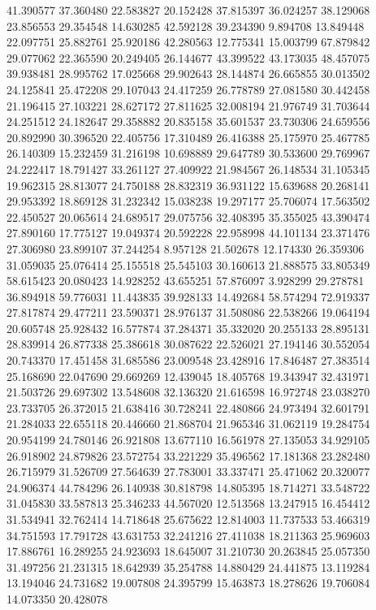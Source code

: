 41.390577
37.360480
22.583827
20.152428
37.815397
36.024257
38.129068
23.856553
29.354548
14.630285
42.592128
39.234390
9.894708
13.849448
22.097751
25.882761
25.920186
42.280563
12.775341
15.003799
67.879842
29.077062
22.365590
20.249405
26.144677
43.399522
43.173035
48.457075
39.938481
28.995762
17.025668
29.902643
28.144874
26.665855
30.013502
24.125841
25.472208
29.107043
24.417259
26.778789
27.081580
30.442458
21.196415
27.103221
28.627172
27.811625
32.008194
21.976749
31.703644
24.251512
24.182647
29.358882
20.835158
35.601537
23.730306
24.659556
20.892990
30.396520
22.405756
17.310489
26.416388
25.175970
25.467785
26.140309
15.232459
31.216198
10.698889
29.647789
30.533600
29.769967
24.222417
18.791427
33.261127
27.409922
21.984567
26.148534
31.105345
19.962315
28.813077
24.750188
28.832319
36.931122
15.639688
20.268141
29.953392
18.869128
31.232342
15.038238
19.297177
25.706074
17.563502
22.450527
20.065614
24.689517
29.075756
32.408395
35.355025
43.390474
27.890160
17.775127
19.049374
20.592228
22.958998
44.101134
23.371476
27.306980
23.899107
37.244254
8.957128
21.502678
12.174330
26.359306
31.059035
25.076414
25.155518
25.545103
30.160613
21.888575
33.805349
58.615423
20.080423
14.928252
43.655251
57.876097
3.928299
29.278781
36.894918
59.776031
11.443835
39.928133
14.492684
58.574294
72.919337
27.817874
29.477211
23.590371
28.976137
31.508086
22.538266
19.064194
20.605748
25.928432
16.577874
37.284371
35.332020
20.255133
28.895131
28.839914
26.877338
25.386618
30.087622
22.526021
27.194146
30.552054
20.743370
17.451458
31.685586
23.009548
23.428916
17.846487
27.383514
25.168690
22.047690
29.669269
12.439045
18.405768
19.343947
32.431971
21.503726
29.697302
13.548608
32.136320
21.616598
16.972748
23.038270
23.733705
26.372015
21.638416
30.728241
22.480866
24.973494
32.601791
21.284033
22.655118
20.446660
21.868704
21.965346
31.062119
19.284754
20.954199
24.780146
26.921808
13.677110
16.561978
27.135053
34.929105
26.918902
24.879826
23.572754
33.221229
35.496562
17.181368
23.282480
26.715979
31.526709
27.564639
27.783001
33.337471
25.471062
20.320077
24.906374
44.784296
26.140938
30.818798
14.805395
18.714271
33.548722
31.045830
33.587813
25.346233
44.567020
12.513568
13.247915
16.454412
31.534941
32.762414
14.718648
25.675622
12.814003
11.737533
53.466319
34.751593
17.791728
43.631753
32.241216
27.411038
18.211363
25.969603
17.886761
16.289255
24.923693
18.645007
31.210730
20.263845
25.057350
31.497256
21.231315
18.642939
35.254788
14.880429
24.441875
13.119284
13.194046
24.731682
19.007808
24.395799
15.463873
18.278626
19.706084
14.073350
20.428078
